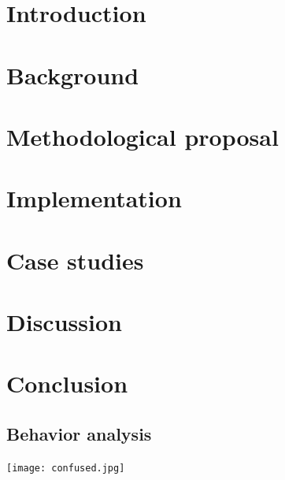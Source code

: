 \documentclass[10pt, a4paper, twocolumn]{article} %
\begin{document}
\setcounter{page}{1}

\section{Introduction}


\section{Background}


\section{Methodological proposal}


\section{Implementation}


\section{Case studies}


\section{Discussion}


\section{Conclusion}


\clearpage
\printbibliography[title={Bibliography}] %



\onecolumn

\begin{appendices}
\section{Behavior analysis}
\texttt{[image: confused.jpg]} 

\end{appendices}

\end{document}

